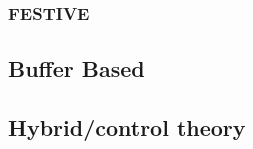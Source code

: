 \subsubsection{FESTIVE\cite{10.1145/2413176.2413189}}

\subsubsection{}

\subsection{Buffer Based}

\subsubsection{\cite{10.1145/2619239.2626296,10.1145/2398776.2398800,10.1145/2491172.2491179}}

\subsubsection{\cite{6229732}}

\subsubsection{\cite{7524428}}

\subsubsection{\cite{10.1145/2910017.2910596}}

\subsection{Hybrid/control theory}

\subsubsection{\cite{10.1145/2413176.2413190,6694183}}

\subsubsection{\cite{140405}}

\subsubsection{\cite{10.1145/2910017.2910593}}

\subsubsection{\cite{10.1145/2483977.2484004}}

\subsubsection{\cite{10.1145/2785956.2787486,10.1145/2670518.2673877}}

\subsubsection{\cite{6691442}}